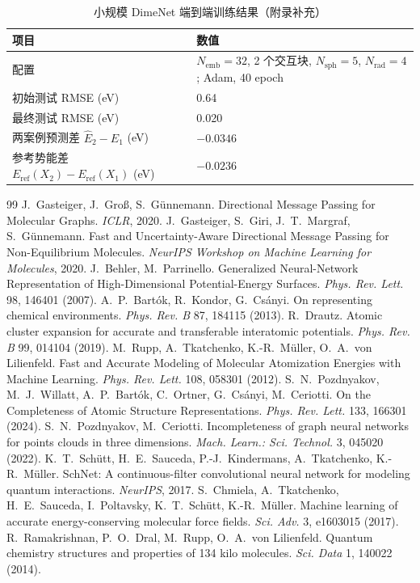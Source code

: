 \documentclass[UTF8,a4paper,11pt]{ctexart}
\begin{document}
\begin{table}[H]
\centering\small
\caption{小规模 DimeNet 端到端训练结果（附录补充）}
\label{tab:train}
\begin{tabular}{@{}ll@{}}
\toprule
项目 & 数值\\
\midrule
配置 & $N_{\mathrm{emb}}=32$, 2 个交互块, $N_{\mathrm{sph}}=5$, $N_{\mathrm{rad}}=4$; Adam, 40 epoch\\
初始测试 RMSE (eV) & 0.64\\
最终测试 RMSE (eV) & 0.020\\
两案例预测差 $\hat E_2-\hat E_1$ (eV) & $-0.0346$\\
参考势能差 $E_{\mathrm{ref}}(X_2)-E_{\mathrm{ref}}(X_1)$ (eV) & $-0.0236$\\
\bottomrule
\end{tabular}
\end{table}

\begin{thebibliography}{99}\footnotesize\setlength{\itemsep}{0pt}
 J.~Gasteiger, J.~Gro\ss, S.~G\"unnemann. Directional Message Passing for Molecular Graphs. \emph{ICLR}, 2020.
 J.~Gasteiger, S.~Giri, J.~T.~Margraf, S.~G\"unnemann. Fast and Uncertainty-Aware Directional Message Passing for Non-Equilibrium Molecules. \emph{NeurIPS Workshop on Machine Learning for Molecules}, 2020.
 J.~Behler, M.~Parrinello. Generalized Neural-Network Representation of High-Dimensional Potential-Energy Surfaces. \emph{Phys. Rev. Lett.} 98, 146401 (2007).
 A.~P.~Bart\'ok, R.~Kondor, G.~Cs\'anyi. On representing chemical environments. \emph{Phys. Rev. B} 87, 184115 (2013).
 R.~Drautz. Atomic cluster expansion for accurate and transferable interatomic potentials. \emph{Phys. Rev. B} 99, 014104 (2019).
 M.~Rupp, A.~Tkatchenko, K.-R.~M\"uller, O.~A.~von Lilienfeld. Fast and Accurate Modeling of Molecular Atomization Energies with Machine Learning. \emph{Phys. Rev. Lett.} 108, 058301 (2012).
 S.~N.~Pozdnyakov, M.~J.~Willatt, A.~P.~Bart\'ok, C.~Ortner, G.~Cs\'anyi, M.~Ceriotti. On the Completeness of Atomic Structure Representations. \emph{Phys. Rev. Lett.} 133, 166301 (2024).
 S.~N.~Pozdnyakov, M.~Ceriotti. Incompleteness of graph neural networks for points clouds in three dimensions. \emph{Mach. Learn.: Sci. Technol.} 3, 045020 (2022).
 K.~T.~Sch\"utt, H.~E.~Sauceda, P.-J.~Kindermans, A.~Tkatchenko, K.-R.~M\"uller. SchNet: A continuous-filter convolutional neural network for modeling quantum interactions. \emph{NeurIPS}, 2017.
 S.~Chmiela, A.~Tkatchenko, H.~E.~Sauceda, I.~Poltavsky, K.~T.~Sch\"utt, K.-R.~M\"uller. Machine learning of accurate energy-conserving molecular force fields. \emph{Sci. Adv.} 3, e1603015 (2017).
 R.~Ramakrishnan, P.~O.~Dral, M.~Rupp, O.~A.~von Lilienfeld. Quantum chemistry structures and properties of 134 kilo molecules. \emph{Sci. Data} 1, 140022 (2014).
\end{thebibliography}
\end{document}
